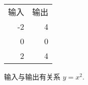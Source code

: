 \documentclass[nofonts]{ctexart}
\begin{document}
\begin{tabular}{|rr|}
	\hline
	输入	& 输出	\\
	-2		& 4		\\
	0		& 0		\\
	2		& 4		\\
	\hline
\end{tabular}
\qquad 输入与输出有关系 $ y=x^2 $.
\end{document}
